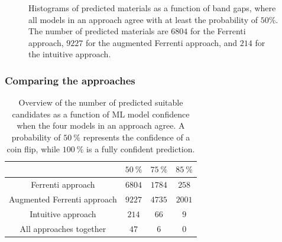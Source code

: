 \documentclass[superscriptaddress,unsortedaddress,
 amsmath,amssymb,
 aps,
]{revtex4-2}
\begin{document}
\begin{figure}[h] %
    \centering
    \begin{subfigure}{1\textwidth}
        \centering
        
    \end{subfigure}%
    
    \begin{subfigure}{1\textwidth}
        \centering
        
    \end{subfigure}
    \caption{Histograms of predicted materials as a function of band gaps, where all models in an approach agree with at least the probability of $50\%$. The number of predicted materials are $6804$ for the Ferrenti approach, $9227$ for the augmented Ferrenti approach, and $214$ for the intuitive approach.}
    \label{fig:histogram}
\end{figure}

\subsubsection*{Comparing the approaches}

\begin{table}[b]
    \centering 
    \caption{Overview of the number of predicted suitable candidates as a function of ML model confidence when the four models in an approach agree. A probability of $50 \ \%$ represents the confidence of a coin flip, while $100 \ \%$ is a fully confident prediction.}
    \begin{tabular}{c|c|c|c}
      & $50 \ \%$ & $75 \ \%$ & $85 \ \%$ \\
     \hline
     Ferrenti approach &  $6804$ & $1784$ & $258$  \\
     Augmented Ferrenti approach &  $9227$ & $4735$  & $2001$  \\ 
     Intuitive approach & $214$ & $66$ & $9$ \\
     \hline
     All approaches together & $47$ & $6$ & 0 \\
    \end{tabular}
    \label{tab:probabilites}
\end{table} 
\end{document}
